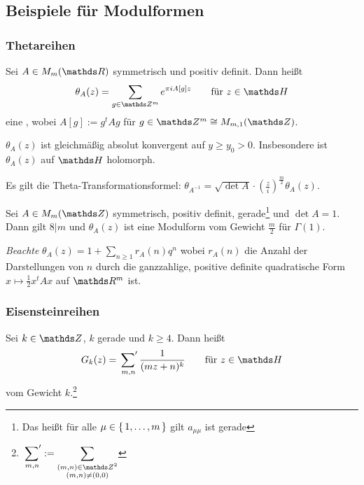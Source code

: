 \subsection{Beispiele für Modulformen}

\subsubsection{Thetareihen}

\begin{defi}
	Sei $A \in M_m(\RR)$ symmetrisch und positiv definit.
	Dann heißt
	\[
		\theta_A(z) = \sum_{g \in \ZZ^m} e^{\pi i A[g]z}
		\qquad \text{für }
		z \in \HH
	\]
	eine , wobei $A[g] := g^t A g$ für $g \in \ZZ^m \cong M_{m,1}(\ZZ)$.
\end{defi}

\begin{satz-list}
	\item $\theta_A(z)$ ist gleichmäßig absolut konvergent auf $y \geq y_0 > 0$.
	Insbesondere ist $\theta_A(z)$ auf $\HH$ holomorph.
	\item Es gilt die Theta-Transformationsformel: $\theta_{A^{-1}} = \sqrt{\det A} \cdot (\frac{z}{i})^{\frac{m}{2}} \theta_A(z)$.
\end{satz-list}

\begin{satz}
	Sei $A \in M_m(\ZZ)$ symmetrisch, positiv definit, gerade\footnote{Das heißt für alle $\mu \in \left\{\,1, \ldots, m\,\right\}$ gilt $a_{\mu\mu}$ ist gerade} und $\det A = 1$.
	Dann gilt $8|m$ und $\theta_A(z)$ ist eine Modulform vom Gewicht $\frac{m}{2}$ für $\Gamma(1)$.
	
	\emph{Beachte} $\theta_A(z) = 1 + \sum_{n \geq 1} r_A(n) q^n$ wobei $r_A(n)$ die Anzahl der Darstellungen von $n$ durch die ganzzahlige, positive definite quadratische Form $x \mapsto \frac{1}{2} x^t A x$ auf $\RR^m$ ist.
\end{satz}

\subsubsection{Eisensteinreihen}

\begin{defi}
	Sei $k \in \ZZ$, $k$ gerade und $k \geq 4$.
	Dann heißt
	\[
		G_k(z) = \sumprime_{m,n} \frac{1}{(mz+n)^k}
		\qquad \text{für }
		z \in \HH
	\]
	 vom Gewicht $k$.\footnote{$\displaystyle \sumprime_{m,n} := \sum_{\substack{(m,n) \in \ZZ^2 \\ (m,n) \not= (0,0)}}$}
\end{defi}


